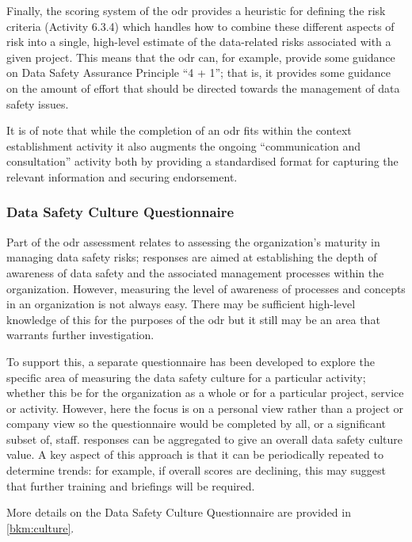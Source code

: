 Finally, the scoring system of the \gls{odr} provides a heuristic for defining the risk criteria
(Activity 6.3.4)
which handles how to combine these different aspects of risk into a single, high-level estimate of the data-related risks associated with a given project. This means that the \gls{odr} can, for example, provide some guidance on Data Safety Assurance Principle ``4 + 1''; that is, it provides some guidance on the amount of effort that should be directed towards the management of data safety issues.
 
It is of note that while the completion of an \gls{odr} fits within the context establishment activity it also augments the ongoing ``communication and consultation'' activity both by providing a standardised format for capturing the relevant \gls{information} and securing endorsement.

\subsubsection{Data Safety Culture Questionnaire}
Part of the \gls{odr} assessment relates to assessing the organization's maturity in managing data safety risks; \glspl{response} are aimed at establishing the depth of awareness of data safety and the associated management processes within the organization. However, measuring the level of awareness of processes and concepts in an organization is not always easy. There may be sufficient high-level knowledge of this for the purposes of the \gls{odr} but it still may be an area that warrants further investigation.

To support this, a separate questionnaire has been developed to explore the specific area of measuring the data safety culture for a particular activity; whether this be for the organization as a whole or for a particular project, service or activity. However, here the focus is on a personal view rather than a project or company view so the questionnaire would be completed by all, or a significant subset of, staff. \Glspl{response} can be aggregated to give an overall data safety culture value. A key aspect of this approach is that it can be periodically repeated to determine trends: for example, if overall scores are declining, this may suggest that further training and briefings will be required.

More details on the Data Safety Culture Questionnaire are provided in \autoref{bkm:culture}.

